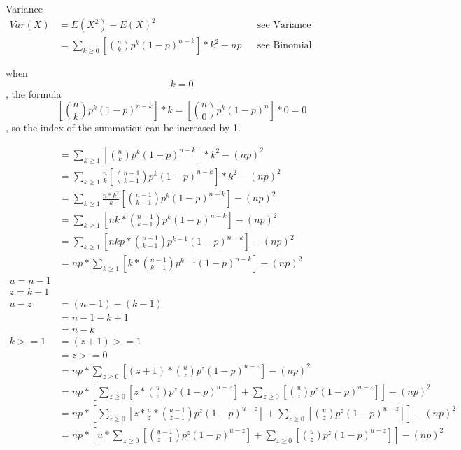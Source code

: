 \documentclass[]{article}
\begin{document}
Variance\\
\begin{align}
	Var(X) &= E(X^2) - E(X)^2 && \text{see Variance}\\
	&= \sum_{k \geqslant 0} {[\binom{n} {k} p^k (1-p)^{n-k}]*k^2} - np && \text{see Binomial Expected Value}
\end{align}

when $$k=0$$, the formula $$[\binom{n} {k} p^k (1-p)^{n-k}] * k = [\binom{n} {0} p^k (1-p)^n] * 0 = 0$$, so the index of the summation can be increased by 1.

\begin{align}
&= \sum_{k \geqslant 1} {[\binom{n} {k} p^k (1-p)^{n-k}]*k^2} - (np)^2\\
&= \sum_{k \geqslant 1} {\frac{n}{k} [\binom{n-1} {k-1} p^k (1-p)^{n-k}]*k^2} - (np)^2\\
&= \sum_{k \geqslant 1} {\frac{n*k^2}{k} [\binom{n-1} {k-1} p^k (1-p)^{n-k}]} - (np)^2\\
&= \sum_{k \geqslant 1} {[nk*\binom{n-1} {k-1} p^k (1-p)^{n-k}]} - (np)^2\\
&= \sum_{k \geqslant 1} {[nkp*\binom{n-1} {k-1} p^{k-1} (1-p)^{n-k}]} - (np)^2\\
&= np*\sum_{k \geqslant 1} {[k*\binom{n-1} {k-1} p^{k-1} (1-p)^{n-k}]} - (np)^2\\
u = n-1\\
z = k-1\\
u-z&=(n-1)-(k-1)\\
&=n-1-k+1\\
&=n-k\\
k >= 1 &= (z+1) >=1\\
&= z >= 0\\
&= np*\sum_{z \geqslant 0} {[(z+1)* \binom{u} {z} p^{z} (1-p)^{u-z}]} - (np)^2\\
&= np*[\sum_{z \geqslant 0} {[z*\binom{u} {z} p^{z} (1-p)^{u-z}]} + \sum_{z \geqslant 0} {[\binom{u} {z} p^{z} (1-p)^{u-z}]}] - (np)^2\\
&= np*[\sum_{z \geqslant 0} {[z*\frac{u}{z}*\binom{u-1} {z-1} p^{z} (1-p)^{u-z}]} + \sum_{z \geqslant 0} {[\binom{u} {z} p^{z} (1-p)^{u-z}]}] - (np)^2\\
&= np*[u*\sum_{z \geqslant 0} {[\binom{u-1} {z-1} p^{z} (1-p)^{u-z}]} + \sum_{z \geqslant 0} {[\binom{u} {z} p^{z} (1-p)^{u-z}]}] - (np)^2\\
\end{align}
\end{document}
